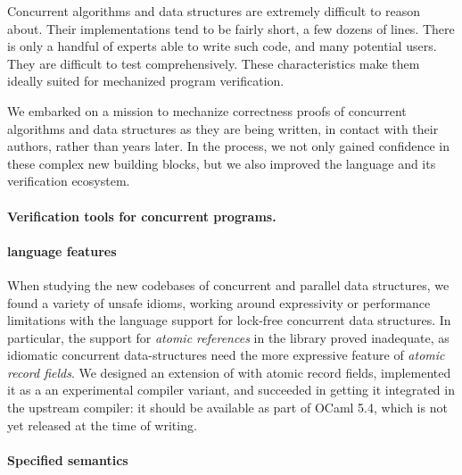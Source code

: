 \documentclass[acmsmall,screen,review,anonymous]{acmart}
\begin{document}
Concurrent algorithms and data structures are extremely difficult to
reason about. Their implementations tend to be fairly short, a few
dozens of lines. There is only a handful of experts able to write such
code, and many potential users. They are difficult to test
comprehensively. These characteristics make them ideally suited for
mechanized program verification.

We embarked on a mission to mechanize correctness proofs of \OCaml
concurrent algorithms and data structures as they are being written,
in contact with their authors, rather than years later. In the
process, we not only gained confidence in these complex new building
blocks, but we also improved the \OCaml language and its verification
ecosystem.

\paragraph{Verification tools for concurrent programs.}

\paragraph{\OCaml language features} When studying the new codebases
of concurrent and parallel data structures, we found a variety of
unsafe idioms, working around expressivity or performance limitations
with the \OCaml language support for lock-free concurrent data
structures. In particular, the support for \emph{atomic references} in
the \OCaml library proved inadequate, as idiomatic concurrent
data-structures need the more expressive feature of \emph{atomic
  record fields}. We designed an extension of \OCaml with atomic
record fields, implemented it as a an experimental compiler variant,
and succeeded in getting it integrated in the upstream \OCaml
compiler: it should be available as part of OCaml 5.4, which is not
yet released at the time of writing.

\paragraph{Specified \OCaml semantics}



\end{document}
